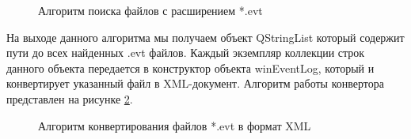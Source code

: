 \begin{figure}[ht]
\caption{Алгоритм поиска файлов с расширением *.evt}
\label{evtsearch:evtSearch}
\end{figure}

На выходе данного алгоритма мы получаем объект QStringList который содержит пути до всех найденных .evt файлов. Каждый экземпляр коллекции строк данного объекта передается в конструктор объекта winEventLog, который и конвертирует указанный файл в XML-документ. Алгоритм работы конвертора представлен на рисунке \ref{evtxml:evtToXML}.

\begin{figure}[ht]
\caption{Алгоритм конвертирования файлов *.evt в формат XML}
\label{evtxml:evtToXML}
\end{figure}
